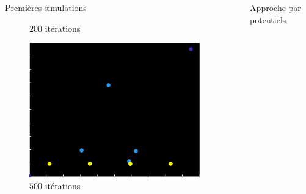 \documentclass[final,hyperref={pdfpagelabels=false}]{beamer}
\begin{document}
\begin{frame}[t]
\begin{columns}[t]
\begin{column}{.465\textwidth}
\begin{block}{Premi\`eres simulations}
\begin{figure}[h!]
\begin{minipage}[b]{0.50\linewidth}
      \caption{\text{ } $200$ it\'erations}
   \end{minipage}\hfill
   \begin{minipage}[b]{0.50\linewidth}   
      \centering \includegraphics[scale=1.4]{simu_500.png}
      \caption{\text{ } $500$ it\'erations}
   \end{minipage}
   
\end{figure}

\end{block}


\end{column} %

\begin{column}{.03\textwidth}\end{column} %
 
\begin{column}{.465\textwidth} %


\begin{block}{Approche par potentiels}


\end{block}
\end{column}
\end{columns}
\end{frame}
\end{document}
